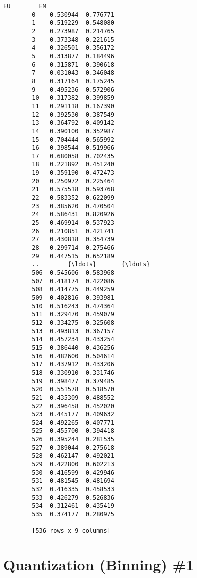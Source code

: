 \documentclass[11pt]{article}
\begin{document}
\begin{Verbatim}[commandchars=\\\{\}]
                   EU        EM  
        0    0.530944  0.776771  
        1    0.519229  0.548080  
        2    0.273987  0.214765  
        3    0.373348  0.221615  
        4    0.326501  0.356172  
        5    0.313877  0.184496  
        6    0.315871  0.390618  
        7    0.031043  0.346048  
        8    0.317164  0.175245  
        9    0.495236  0.572906  
        10   0.317382  0.399859  
        11   0.291118  0.167390  
        12   0.392530  0.387549  
        13   0.364792  0.409142  
        14   0.390100  0.352987  
        15   0.704444  0.565992  
        16   0.398544  0.519966  
        17   0.680058  0.702435  
        18   0.221892  0.451240  
        19   0.359190  0.472473  
        20   0.250972  0.225464  
        21   0.575518  0.593768  
        22   0.583352  0.622099  
        23   0.385620  0.470504  
        24   0.586431  0.820926  
        25   0.469914  0.537923  
        26   0.210851  0.421741  
        27   0.430818  0.354739  
        28   0.299714  0.275466  
        29   0.447515  0.652189  
        ..        {\ldots}       {\ldots}  
        506  0.545606  0.583968  
        507  0.418174  0.422086  
        508  0.414775  0.449259  
        509  0.402816  0.393981  
        510  0.516243  0.474364  
        511  0.329470  0.459079  
        512  0.334275  0.325608  
        513  0.493813  0.367157  
        514  0.457234  0.433254  
        515  0.386440  0.436256  
        516  0.482600  0.504614  
        517  0.437912  0.433206  
        518  0.330910  0.331746  
        519  0.398477  0.379485  
        520  0.551578  0.518570  
        521  0.435309  0.488552  
        522  0.396458  0.452020  
        523  0.445177  0.409632  
        524  0.492265  0.407771  
        525  0.455700  0.394418  
        526  0.395244  0.281535  
        527  0.389044  0.275618  
        528  0.462147  0.492021  
        529  0.422800  0.602213  
        530  0.416599  0.429946  
        531  0.481545  0.481694  
        532  0.416335  0.458533  
        533  0.426279  0.526836  
        534  0.312461  0.435419  
        535  0.374177  0.280975  
        
        [536 rows x 9 columns]
\end{Verbatim}
            
    \hypertarget{quantization-binning-1}{%
\section{Quantization (Binning) \#1}\label{quantization-binning-1}}
\end{document}
